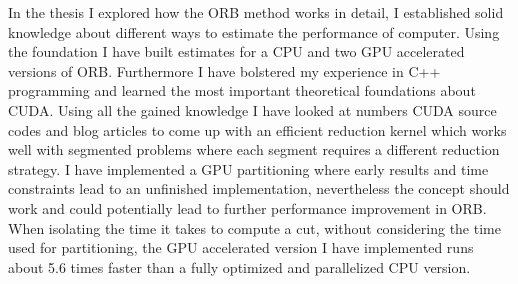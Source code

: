 \documentclass[]{article}
\begin{document}
In the thesis I explored how the ORB method works in detail, I established solid knowledge about different ways to estimate the performance of computer. Using the foundation I have built estimates for a CPU and two GPU accelerated versions of ORB. Furthermore I have bolstered my experience in C++ programming and learned the most important theoretical foundations about CUDA. Using all the gained knowledge I have looked at numbers CUDA source codes and blog articles to come up with an efficient reduction kernel which works well with segmented problems where each segment requires a different reduction strategy. I have implemented a GPU partitioning where early results and time constraints lead to an unfinished implementation, nevertheless the concept should work and could potentially lead to further performance improvement in ORB. 
When isolating the time it takes to compute a cut, without considering the time used for partitioning, the GPU accelerated version I have implemented runs about 5.6 times faster than a fully optimized and parallelized CPU version. 
 


%
\newpage



\listoffigures
\listoftables
\end{document}
